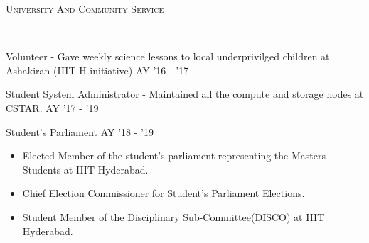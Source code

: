 \documentclass[10pt]{article}
\newenvironment{changemargin}[2]{%
    \begin{list}{}{%
            \setlength{\topsep}{0pt}%
            \setlength{\leftmargin}{#1}%
            \setlength{\rightmargin}{#2}%
            \setlength{\listparindent}{\parindent}%
        \setlength{\itemindent}{\parindent}%
            \setlength{\parsep}{\parskip}%
        }%
\item[]}{\end{list}
}
\newcommand{\lineover}{
    \begin{changemargin}{-0.05in}{-0.10in}
        \vspace*{-8pt}
        \hrulefill \\
        \vspace*{-2pt}
    \end{changemargin}
}
\newcommand{\header}[1]{
    \begin{changemargin}{-0.75in}{-0.75in}
        \scshape{#1}\\
        \lineover
    \end{changemargin}
}
\newenvironment{body} {
    \vspace*{-16pt}
    \begin{changemargin}{-0.6in}{-0.65in}
    }   
    {\end{changemargin}
}
\begin{document}
\header{University And Community Service}
\vspace{14pt}
\begin{body}
    Volunteer - Gave weekly science lessons to local underprivilged children at Ashakiran (IIIT-H initiative) \hfill{AY '16 - '17}
\end{body}
\vspace{14pt}
\begin{body}
    Student System Administrator - Maintained all the compute and storage nodes at CSTAR. \hfill{AY '17 - '19}
\end{body}
\vspace{14pt}
\begin{body}
    Student's Parliament \hfill{AY '18 - '19}
    \begin{itemize}
        \item Elected Member of the student's parliament representing the Masters Students at IIIT Hyderabad.
        \item Chief Election Commissioner for Student's Parliament Elections.
        \item Student Member of the Disciplinary Sub-Committee(DISCO) at IIIT Hyderabad.
    \end{itemize}
\end{body}






\end{document}
